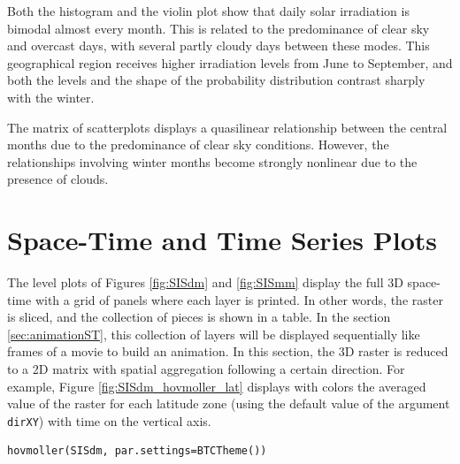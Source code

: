 Both the histogram and the violin plot show that daily solar
irradiation is bimodal almost every month. This is related to the
predominance of clear sky and overcast days, with several partly
cloudy days between these modes. This geographical region receives
higher irradiation levels from June to September, and both the levels
and the shape of the probability distribution contrast sharply with
the winter.

The matrix of scatterplots displays a quasilinear relationship
between the central months due to the predominance of clear sky
conditions. However, the relationships involving winter months become
strongly nonlinear due to the presence of clouds.
\section{Space-Time and Time Series Plots}
\label{sec-4}
The level plots of Figures \ref{fig:SISdm} and \ref{fig:SISmm}
display the full 3D space-time with a grid of panels where each layer
is printed. In other words, the raster is sliced, and the collection of
pieces is shown in a table. In the section \ref{sec:animationST}, this
collection of layers will be displayed sequentially like frames of a
movie to build an animation. In this section, the 3D raster is reduced
to a 2D matrix with spatial aggregation following a certain
direction. For example, Figure \ref{fig:SISdm_hovmoller_lat}
displays with colors the averaged value of the raster for each
latitude zone (using the default value of the argument \texttt{dirXY}) with
time on the vertical axis.


\lstset{language=R,numbers=none}
\begin{lstlisting}
hovmoller(SISdm, par.settings=BTCTheme())
\end{lstlisting}

